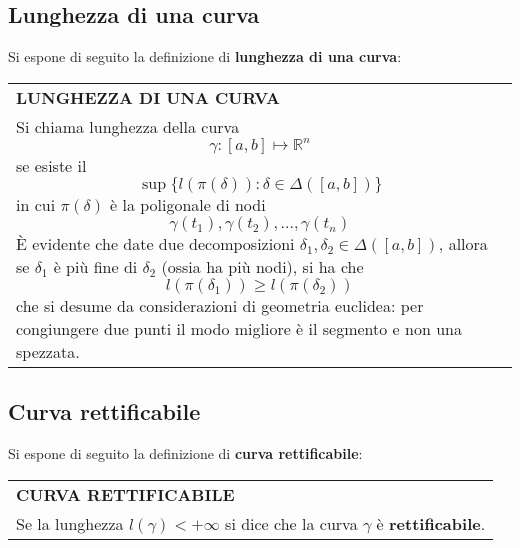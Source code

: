 \documentclass[a4paper]{extarticle}
\renewcommand\arraystretch{}
\begin{document}
\vspace{1em}
\subsection{Lunghezza di una curva}
Si espone di seguito la definizione di \textbf{lunghezza di una curva}:

\vspace{1em}
\setlength{\tabcolsep}{14pt}
\renewcommand{\arraystretch}{2}
\noindent
\begin{tabularx}{\textwidth}{@{}|P|@{}}
    \hline
    {\textbf{LUNGHEZZA DI UNA CURVA}}\\
    \parbox{\linewidth}{Si chiama lunghezza della curva
    \[\gamma : [a,b] \longmapsto \mathbb{R}^n\]
    se esiste il
    \[\sup \{l(\pi(\delta)) : \delta \in \Delta \left([a,b]\right)\}\]
    in cui $\pi(\delta)$ è la poligonale di nodi
    \[\gamma(t_1),\gamma(t_2),\dots,\gamma(t_n)\]
    È evidente che date due decomposizioni $\delta_1,\delta_2 \in \Delta([a,b])$, allora se $\delta_1$ è più fine di $\delta_2$ (ossia ha più nodi), si ha che
    \[l(\pi(\delta_1)) \geq l(\pi(\delta_2))\]
    che si desume da considerazioni di geometria euclidea: per congiungere due punti il modo migliore è il segmento e non una spezzata.
    \vspace{3mm}}\\
    \hline
\end{tabularx}

\vspace{1em}
\subsection{Curva rettificabile}
Si espone di seguito la definizione di \textbf{curva rettificabile}:

\vspace{1em}
\setlength{\tabcolsep}{14pt}
\renewcommand{\arraystretch}{2}
\noindent
\begin{tabularx}{\textwidth}{@{}|P|@{}}
    \hline
    {\textbf{CURVA RETTIFICABILE}}\\
    \parbox{\linewidth}{Se la lunghezza $l(\gamma) < +\infty$ si dice che la curva $\gamma$ è \textbf{rettificabile}.\vspace{3mm}}\\
    \hline
\end{tabularx}
\end{document}
